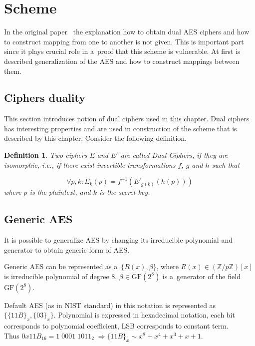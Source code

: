 \documentclass[11pt,oneside,final]{fithesis2}
\newtheorem{mydef}{Definition}
\newcommand{\gfe}{\ensuremath{\text{GF}\left(2^8\right)}}
\begin{document}
    
    \section{Scheme}

    In the original paper~\citep{Karroumi:2010:PWA:2041036.2041060} the explanation how to obtain dual AES ciphers and how to construct mapping from one 
    to another is not given. This is
    important part since it plays crucial role in a~proof that this scheme is vulnerable. At first is described generalization of the AES and how to construct
    mappings between them. 

	\subsection{Ciphers duality}
	This section introduces notion of dual ciphers used in this chapter. Dual ciphers has interesting properties and are used in construction
	of the scheme that is described by this chapter. Consider the following definition.
	
	\begin{mydef}\label{def:dual_cipher}
	Two ciphers $E$ and $E'$ are called Dual Ciphers, if they are
	isomorphic, i.e., if there exist invertible transformations $f$, $g$ and $h$ such
	that

	\begin{equation} 
	\forall p, k: E_k(p) = f^{-1}\left(E'_{g(k)}(h(p))\right)
	\end{equation}
	where $p$ is the plaintext, and $k$ is the secret key.
	\end{mydef}

	\subsection{Generic AES}
	It is possible to generalize AES by changing its irreducible polynomial and generator to obtain generic form of AES.

	Generic AES can be represented as a~$\{R(x), \beta \}$, where $R(x) \in \left(\mathbb{Z}/p\mathbb{Z}\right)[x]$ is 
	irreducible polynomial of degree 8, $\beta \in \gfe$ is a~generator of the field $\gfe$.

	Default AES (as in NIST standard) in this notation is represented as $\{\{11B\}_x, \{03\}_x\}$. Polynomial is expressed
	in hexadecimal notation, each bit corresponds to polynomial coefficient, LSB corresponds to constant term.\\
	Thus $0x11B_{16} = 1 \; 0001 \; 1011_{2} \; \Rightarrow \{11B\}_x \sim x^8+x^4+x^3+x+1$.
\end{document}
